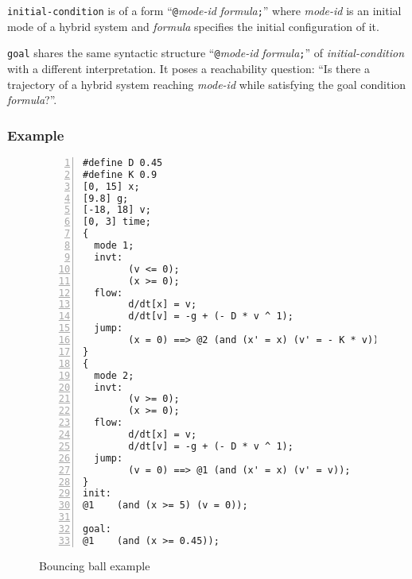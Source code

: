 \texttt{initial-condition} is of a form
``\texttt{@}\textit{mode-id} \textit{formula}\texttt{;}''
where \textit{mode-id} is an initial mode of a hybrid system and
\textit{formula} specifies the initial configuration of it.

\texttt{goal} shares the same syntactic structure
``\texttt{@}\textit{mode-id} \textit{formula}\texttt{;}'' of
\textit{initial-condition} with a different interpretation. It poses a
reachability question: ``Is there a trajectory of a hybrid system
reaching \textit{mode-id} while satisfying the goal condition \textit{formula}?''.


\subsubsection{Example}
\begin{figure}
  \centering
  \begin{Verbatim}[fontfamily=courier, frame=single, framesep=1mm,
  numbers=left, fontsize=\scriptsize]
#define D 0.45
#define K 0.9
[0, 15] x;
[9.8] g;
[-18, 18] v;
[0, 3] time;
{
  mode 1;
  invt:
        (v <= 0);
        (x >= 0);
  flow:
        d/dt[x] = v;
        d/dt[v] = -g + (- D * v ^ 1);
  jump:
        (x = 0) ==> @2 (and (x' = x) (v' = - K * v));
}
{
  mode 2;
  invt:
        (v >= 0);
        (x >= 0);
  flow:
        d/dt[x] = v;
        d/dt[v] = -g + (- D * v ^ 1);
  jump:
        (v = 0) ==> @1 (and (x' = x) (v' = v));
}
init:
@1    (and (x >= 5) (v = 0));

goal:
@1    (and (x >= 0.45));
\end{Verbatim}
  \caption{Bouncing ball example}
  \label{fig:bouncing-ball}
\end{figure}

